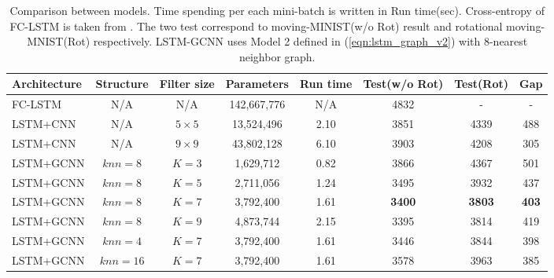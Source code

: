 \documentclass{article} %
\newcommand{\eqnref}[1]{(\ref{eqn:#1})}
\begin{document}
\begin{table}
	\centering
	{\small
	\begin{tabular}{lccccccc}
		\toprule
		Architecture & Structure & Filter size & Parameters & Run time & Test(w/o Rot) & Test(Rot) & Gap\\
		\midrule
		FC-LSTM & N/A & N/A & 142,667,776 & N/A & 4832 & - & -\\
		LSTM+CNN & N/A & $5 \times 5$ & 13,524,496 & 2.10 & 3851 & 4339 & 488 \\
		LSTM+CNN & N/A & $9 \times 9$ & 43,802,128 & 6.10 & 3903 & 4208 & 305 \\

		LSTM+GCNN & $knn=8$ & $K=3$ & 1,629,712 & 0.82 & 3866 & 4367 & 501 \\
		LSTM+GCNN & $knn=8$ & $K=5$ & 2,711,056 & 1.24 & 3495 & 3932 & 437 \\
		LSTM+GCNN & $knn=8$ & $K=7$ & 3,792,400 & 1.61 & {\bf 3400} & {\bf 3803} & {\bf 403}\\
		LSTM+GCNN & $knn=8$ & $K=9$ & 4,873,744 & 2.15 & 3395 & 3814 & 419 \\
		
		LSTM+GCNN & $knn=4$ & $K=7$ & 3,792,400 & 1.61 & 3446 & 3844 & 398 \\
		LSTM+GCNN & $knn=16$ & $K=7$ & 3,792,400 & 1.61 & 3578 & 3963 & 385 \\
		\bottomrule
	\end{tabular}
	}
	\caption{Comparison between models. Time spending per each mini-batch is written in Run time(sec). Cross-entropy of FC-LSTM is taken from \cite{convlstm}. The two test correspond to moving-MINIST(w/o Rot) result and rotational moving-MNIST(Rot) respectively. LSTM-GCNN uses Model 2 defined in \eqnref{lstm_graph_v2} with 8-nearest neighbor graph.}
	\label{tab:moving_mnist}
\end{table}
\end{document}
